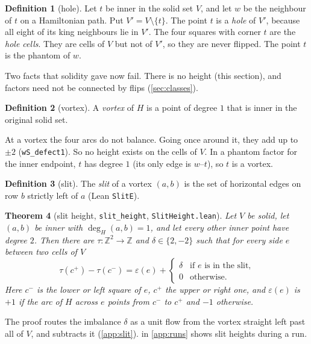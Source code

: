 \documentclass[11pt]{article}
\theoremstyle{plain}
\newtheorem{theorem}{Theorem}[section]
\theoremstyle{definition}
\newtheorem{definition}[theorem]{Definition}
\theoremstyle{remark}
\newcommand{\Z}{\mathbb{Z}}
\newcommand{\lean}[1]{\texttt{#1}}
\begin{document}
\begin{definition}[hole]
Let $t$ be inner in the solid set $V$, and let $w$ be the neighbour of $t$ on a Hamiltonian path.
Put $V'=V\setminus\{t\}$.
The point $t$ is a \emph{hole} of $V'$, because all eight of its king neighbours lie in $V'$.
The four squares with corner $t$ are the \emph{hole cells}.
They are cells of $V$ but not of $V'$, so they are never flipped.
The point $t$ is the phantom of $w$.
\end{definition}

Two facts that solidity gave now fail.
There is no height (this section), and factors need not be connected by flips (\cref{sec:classes}).

\begin{definition}[vortex]
A \emph{vortex} of $H$ is a point of degree $1$ that is inner in the original solid set.
\end{definition}

At a vortex the four arcs do not balance.
Going once around it, they add up to $\pm2$ (\lean{wS\_defect1}).
So no height exists on the cells of $V$.
In a phantom factor for the inner endpoint, $t$ has degree $1$ (its only edge is $w$--$t$), so $t$
is a vortex.

\begin{definition}[slit]
The \emph{slit} of a vortex $(a,b)$ is the set of horizontal edges on row $b$ strictly left of $a$
(Lean \lean{SlitE}).
\end{definition}

\begin{theorem}[slit height, \lean{slit\_height}, \lean{SlitHeight.lean}]
\label{thm:slit}
Let $V$ be solid, let $(a,b)$ be inner with $\deg_H(a,b)=1$, and let every other inner point have
degree $2$.
Then there are $\tau\colon\Z^2\to\Z$ and $\delta\in\{2,-2\}$ such that for every side $e$ between two
cells of $V$
\[
  \tau(c^+)-\tau(c^-)
  = \varepsilon(e)+\begin{cases}\delta & \text{if $e$ is in the slit,}\\ 0&\text{otherwise.}\end{cases}
\]
Here $c^-$ is the lower or left square of $e$, $c^+$ the upper or right one, and $\varepsilon(e)$ is
$+1$ if the arc of $H$ across $e$ points from $c^-$ to $c^+$ and $-1$ otherwise.
\end{theorem}

The proof routes the imbalance $\delta$ as a unit flow from the vortex straight left past all of
$V$, and subtracts it (\cref{app:slit}).
 in \cref{app:runs} shows slit heights during a run.
\end{document}
